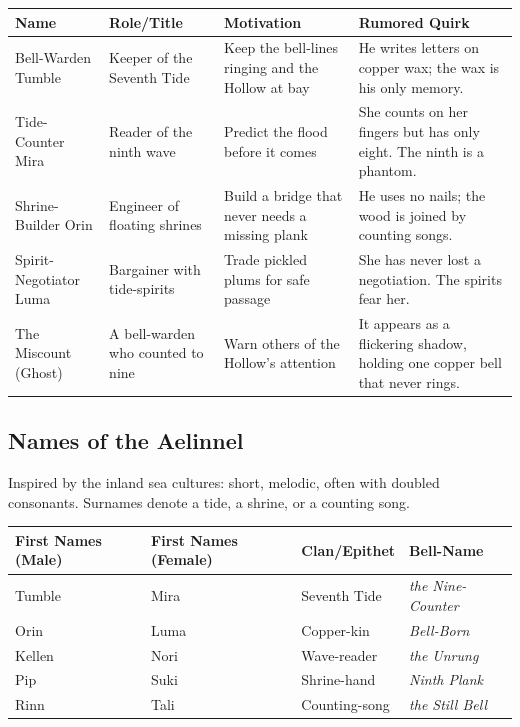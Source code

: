 \begin{longtable}{|p{}|p{}|p{}|p{}|}
\hline
\textbf{Name} & \textbf{Role/Title} & \textbf{Motivation} & \textbf{Rumored Quirk} \\
\hline
Bell-Warden Tumble & Keeper of the Seventh Tide & Keep the bell-lines ringing and the Hollow at bay & He writes letters on copper wax; the wax is his only memory. \\
\hline
Tide-Counter Mira & Reader of the ninth wave & Predict the flood before it comes & She counts on her fingers but has only eight. The ninth is a phantom. \\
\hline
Shrine-Builder Orin & Engineer of floating shrines & Build a bridge that never needs a missing plank & He uses no nails; the wood is joined by counting songs. \\
\hline
Spirit-Negotiator Luma & Bargainer with tide-spirits & Trade pickled plums for safe passage & She has never lost a negotiation. The spirits fear her. \\
\hline
The Miscount (Ghost) & A bell-warden who counted to nine & Warn others of the Hollow's attention & It appears as a flickering shadow, holding one copper bell that never rings. \\
\hline
\end{longtable}

\subsection*{Names of the Aelinnel}
\label{sec:aelinnel-names}

Inspired by the inland sea cultures: short, melodic, often with doubled consonants. Surnames denote a tide, a shrine, or a counting song.

\begin{longtable}{|p{}|p{}|p{}|p{}|}
\hline
\textbf{First Names (Male)} & \textbf{First Names (Female)} & \textbf{Clan/Epithet} & \textbf{Bell-Name} \\
\hline
Tumble & Mira & Seventh Tide & \textit{the Nine-Counter} \\
\hline
Orin & Luma & Copper-kin & \textit{Bell-Born} \\
\hline
Kellen & Nori & Wave-reader & \textit{the Unrung} \\
\hline
Pip & Suki & Shrine-hand & \textit{Ninth Plank} \\
\hline
Rinn & Tali & Counting-song & \textit{the Still Bell} \\
\hline
\end{longtable}

